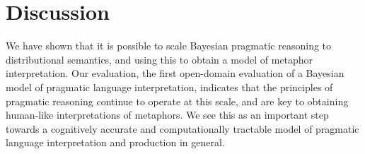 \documentclass[9pt,twocolumn,twoside,lineno]{pnas-new}
\newcommand{\Listener}{L}
\newcommand{\QLONE}{\Listener_{{1}}^{{Q}}}
\begin{document}


		

\section{Discussion} \label{conc} 

	We have shown that it is possible to scale Bayesian pragmatic reasoning to distributional semantics, and using this to obtain a model of metaphor interpretation. Our evaluation, the first open-domain evaluation of a Bayesian model of pragmatic language interpretation, indicates that the principles of pragmatic reasoning continue to operate at this scale, and are key to obtaining human-like interpretations of metaphors. We see this as an important step towards a cognitively accurate and computationally tractable model of pragmatic language interpretation and production in general.



\end{document}
